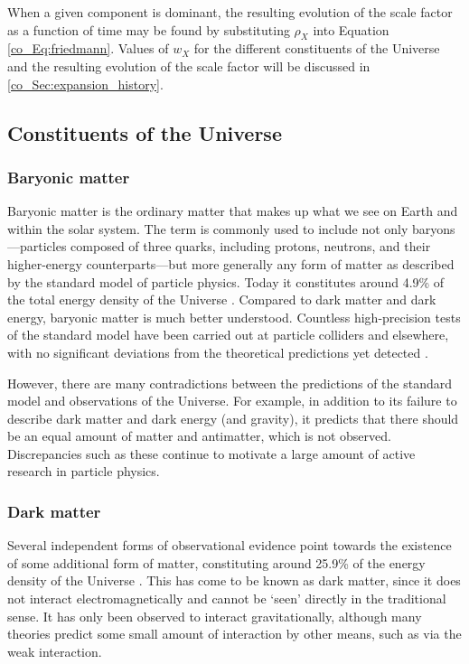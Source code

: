When a given component is dominant, the resulting evolution of the scale factor as a function of time may be found by substituting $\rho_X$ into Equation \eqref{co_Eq:friedmann}. Values of $w_X$ for the different constituents of the Universe and the resulting evolution of the scale factor will be discussed in \autoref{co_Sec:expansion_history}.

\subsection{Constituents of the Universe}
\label{co_Sec:constituents}

\subsubsection{Baryonic matter}

Baryonic matter is the ordinary matter that makes up what we see on Earth and within the solar system. The term is commonly used to include not only baryons---particles composed of three quarks, including protons, neutrons, and their higher-energy counterparts---but more generally any form of matter as described by the standard model of particle physics. Today it constitutes around 4.9\% of the total energy density of the Universe \citep{Planck2018VI}. Compared to dark matter and dark energy, baryonic matter is much better understood. Countless high-precision tests of the standard model have been carried out at particle colliders and elsewhere, with no significant deviations from the theoretical predictions yet detected \citep[e.g.][for a review]{Erler2019}.

However, there are many contradictions between the predictions of the standard model and observations of the Universe. For example, in addition to its failure to describe dark matter and dark energy (and gravity), it predicts that there should be an equal amount of matter and antimatter, which is not observed. Discrepancies such as these continue to motivate a large amount of active research in particle physics.

\subsubsection{Dark matter}

Several independent forms of observational evidence point towards the existence of some additional form of matter, constituting around 25.9\% of the energy density of the Universe \citep{Planck2018VI}. This has come to be known as dark matter, since it does not interact electromagnetically and cannot be `seen' directly in the traditional sense. It has only been observed to interact gravitationally, although many theories predict some small amount of interaction by other means, such as via the weak interaction.

